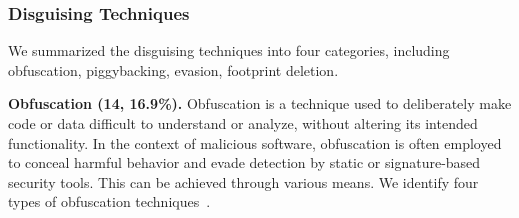 \subsubsection{Disguising Techniques}\label{sec:disguise_technique}

We summarized the disguising techniques into four categories, including obfuscation, piggybacking, evasion, footprint deletion.

\textbf{Obfuscation {(14, 16.9\%)}.} Obfuscation is a technique used to deliberately make code or data difficult to understand or analyze, without altering its intended functionality. In the context of malicious software, obfuscation is often employed to conceal harmful behavior and evade detection by static or signature-based security tools. This can be achieved through various means. We identify four types of obfuscation techniques~\cite{herrera2020, badhani2018evading, neupane2023beyond, halder2024memptec}.
